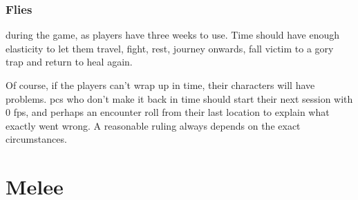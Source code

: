 \begin{multicols}{2}
\subsubsection{ Flies}
during the game, as players have three weeks to use.
Time should have enough elasticity to let them travel, fight, rest, journey onwards, fall victim to a gory trap and return to heal again.

Of course, if the players can't wrap up in time, their characters will have problems.
\Glspl{pc} who don't make it back in time should start their next session with 0 \glspl{fp}, and perhaps an encounter roll from their last location to explain what exactly went wrong.
A reasonable ruling always depends on the exact circumstances.

\end{multicols}

\pagebreak[4]
\section{Melee}

